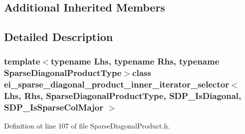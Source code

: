 \subsection*{Additional Inherited Members}


\subsection{Detailed Description}
\subsubsection*{template$<$typename Lhs, typename Rhs, typename Sparse\-Diagonal\-Product\-Type$>$class ei\-\_\-sparse\-\_\-diagonal\-\_\-product\-\_\-inner\-\_\-iterator\-\_\-selector$<$ Lhs, Rhs, Sparse\-Diagonal\-Product\-Type, S\-D\-P\-\_\-\-Is\-Diagonal, S\-D\-P\-\_\-\-Is\-Sparse\-Col\-Major $>$}



Definition at line 107 of file Sparse\-Diagonal\-Product.\-h.



